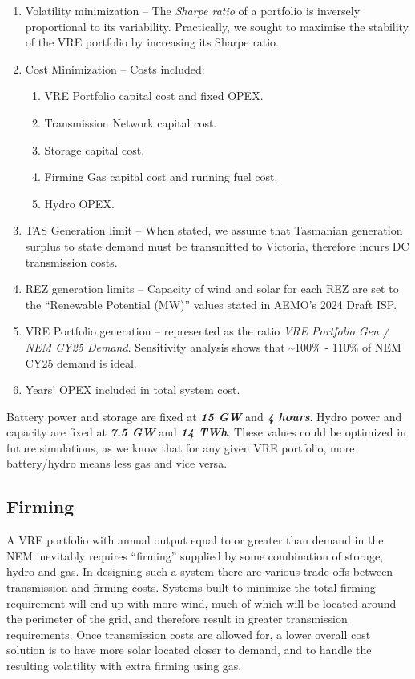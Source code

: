 \documentclass[
  letterpaper,
  DIV=11,
  numbers=noendperiod]{scrartcl}
\begin{document}
\begin{enumerate}
\def\labelenumi{\arabic{enumi}.}
\item
  Volatility minimization -- The \emph{Sharpe ratio} of a portfolio is
  inversely proportional to its variability. Practically, we sought to
  maximise the stability of the VRE portfolio by increasing its Sharpe
  ratio.
\item
  Cost Minimization -- Costs included:

  \begin{enumerate}
  \def\labelenumii{\alph{enumii}.}
  \item
    VRE Portfolio capital cost and fixed OPEX.
  \item
    Transmission Network capital cost.
  \item
    Storage capital cost.
  \item
    Firming Gas capital cost and running fuel cost.
  \item
    Hydro OPEX.
  \end{enumerate}
\item
  TAS Generation limit -- When stated, we assume that Tasmanian
  generation surplus to state demand must be transmitted to Victoria,
  therefore incurs DC transmission costs.
\item
  REZ generation limits -- Capacity of wind and solar for each REZ are
  set to the ``Renewable Potential (MW)'' values stated in AEMO's 2024
  Draft ISP.
\item
  VRE Portfolio generation -- represented as the ratio \emph{VRE
  Portfolio Gen / NEM CY25 Demand}. Sensitivity analysis shows that
  \textasciitilde100\% - 110\% of NEM CY25 demand is ideal.
\item
  Years' OPEX included in total system cost.
\end{enumerate}

Battery power and storage are fixed at \textbf{\emph{15 GW}} and
\textbf{\emph{4 hours}}. Hydro power and capacity are fixed at
\textbf{\emph{7.5 GW}} and \textbf{\emph{14 TWh}}. These values could be
optimized in future simulations, as we know that for any given VRE
portfolio, more battery/hydro means less gas and vice versa.

\subsection{Firming}\label{firming}

A VRE portfolio with annual output equal to or greater than demand in
the NEM inevitably requires ``firming'' supplied by some combination of
storage, hydro and gas. In designing such a system there are various
trade-offs between transmission and firming costs. Systems built to
minimize the total firming requirement will end up with more wind, much
of which will be located around the perimeter of the grid, and therefore
result in greater transmission requirements. Once transmission costs are
allowed for, a lower overall cost solution is to have more solar located
closer to demand, and to handle the resulting volatility with extra
firming using gas.
\end{document}
